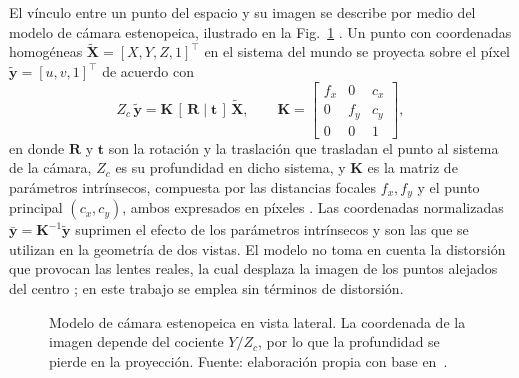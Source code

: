 El vínculo entre un punto del espacio y su imagen se describe por medio del modelo de cámara estenopeica, ilustrado en la Fig.~\ref{fig:camara} \cite{hartley2003mvg}.
Un punto con coordenadas homogéneas $\tilde{\mathbf{X}} = [X, Y, Z, 1]^{\top}$ en el sistema del mundo se proyecta sobre el píxel $\tilde{\mathbf{y}} = [u, v, 1]^{\top}$ de acuerdo con
\begin{equation}
Z_c \, \tilde{\mathbf{y}} = \mathbf{K}\,[\,\mathbf{R} \mid \mathbf{t}\,]\,\tilde{\mathbf{X}},
\qquad
\mathbf{K} =
\begin{bmatrix}
f_x & 0 & c_x \\
0 & f_y & c_y \\
0 & 0 & 1
\end{bmatrix},
\label{eq:camara}
\end{equation}
en donde $\mathbf{R}$ y $\mathbf{t}$ son la rotación y la traslación que trasladan el punto al sistema de la cámara, $Z_c$ es su profundidad en dicho sistema, y $\mathbf{K}$ es la matriz de parámetros intrínsecos, compuesta por las distancias focales $f_x, f_y$ y el punto principal $(c_x, c_y)$, ambos expresados en píxeles \cite{hartley2003mvg}.
Las coordenadas normalizadas $\bar{\mathbf{y}} = \mathbf{K}^{-1}\tilde{\mathbf{y}}$ suprimen el efecto de los parámetros intrínsecos y son las que se utilizan en la geometría de dos vistas.
El modelo no toma en cuenta la distorsión que provocan las lentes reales, la cual desplaza la imagen de los puntos alejados del centro \cite{hartley2003mvg}; en este trabajo se emplea sin términos de distorsión.

\begin{figure}[H]
\centering
{}
\caption[Modelo de cámara estenopeica]{Modelo de cámara estenopeica en vista lateral. La coordenada de la imagen depende del cociente $Y/Z_c$, por lo que la profundidad se pierde en la proyección. Fuente: elaboración propia con base en~\cite{hartley2003mvg}.}
\label{fig:camara}
\end{figure}

